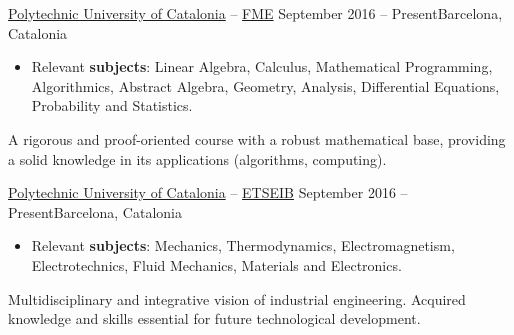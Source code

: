 \documentclass[10pt, a4paper, ragged2e]{../altacv}
\begin{document}

\begin{adjustwidth}{0pt}{-10pt}
  \begin{fullwidth}
    \makecvheader
  \end{fullwidth}
\end{adjustwidth}

\medskip
{}

{\href{https://www.upc.edu/en}{Polytechnic University of Catalonia} --
  \href{https://fme.upc.edu/en}{FME}}
{September 2016 -- Present}{Barcelona, Catalonia}
\begin{itemize}
  \item Relevant \textbf{subjects}: Linear Algebra, Calculus, Mathematical
  Programming, Algorithmics, Abstract Algebra, Geometry, Analysis, Differential
  Equations, Probability and Statistics.
\end{itemize}
A rigorous and proof-oriented course with a robust mathematical base, providing
a solid knowledge in its applications (algorithms, computing).

\divider

{\href{https://www.upc.edu/en}{Polytechnic University of Catalonia} --
\href{https://etseib.upc.edu/en}{ETSEIB}}
{September 2016 -- Present}{Barcelona, Catalonia}
\begin{itemize}
  \item Relevant \textbf{subjects}: Mechanics, Thermodynamics, Electromagnetism,
  Electrotechnics, Fluid Mechanics, Materials and Electronics.
\end{itemize}
Multidisciplinary and integrative vision of industrial engineering. Acquired
knowledge and skills essential for future technological development.
\end{document}
